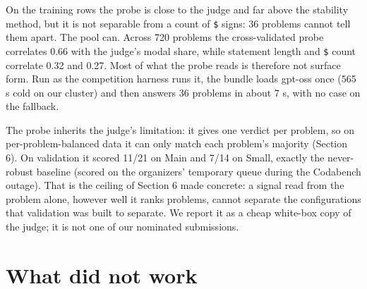 \documentclass{article}
\begin{document}
On the training rows the probe is close to the judge and far above the stability method, but it is not separable from a count of \texttt{\$} signs: 36 problems cannot tell them apart. The pool can. Across 720 problems the cross-validated probe correlates 0.66 with the judge's modal share, while statement length and \texttt{\$} count correlate 0.32 and 0.27. Most of what the probe reads is therefore not surface form. Run as the competition harness runs it, the bundle loads gpt-oss once (565 s cold on our cluster) and then answers 36 problems in about 7 s, with no case on the fallback.

The probe inherits the judge's limitation: it gives one verdict per problem, so on per-problem-balanced data it can only match each problem's majority (Section 6). On validation it scored 11/21 on Main and 7/14 on Small, exactly the never-robust baseline (scored on the organizers' temporary queue during the Codabench outage). That is the ceiling of Section 6 made concrete: a signal read from the problem alone, however well it ranks problems, cannot separate the configurations that validation was built to separate. We report it as a cheap white-box copy of the judge; it is not one of our nominated submissions.

\section{What did not work}\label{what-did-not-work}
\end{document}
